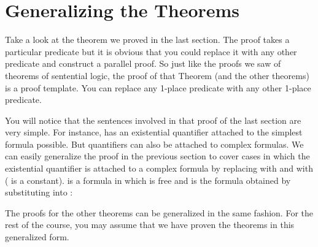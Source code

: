 \section{Generalizing the Theorems}

Take a look at the theorem we proved in the last section. The proof takes a 
particular predicate  but it is obvious that you could replace it with any 
other predicate and construct a parallel proof. So just like the proofs we saw 
of theorems of sentential logic, the proof of that Theorem (and the other 
theorems) is a proof template. You can replace any 1-place predicate with any 
other 1-place  predicate. 

You will notice that the sentences involved in that proof of the last section 
are very simple.  For instance,  has an existential quantifier 
attached to the simplest formula possible. But quantifiers can also be attached 
to complex formulas. We can easily generalize the proof in the previous section 
to cover cases in which the existential quantifier is attached to a complex 
formula by replacing  with  and  with  ( 
is a constant).  is a formula in which  is free and  
is the formula obtained by substituting  into :


\begin{argumentN}[1]









\end{argumentN}



The proofs for the other theorems can be generalized in the same fashion. For 
the rest of the course, you may assume that we have proven the theorems in this 
generalized form.


